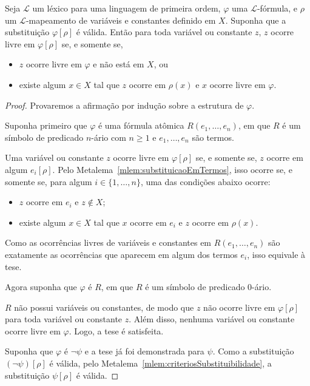 \begin{metalemma}\label{mlem:substituicaoEmFormulas2}
    Seja $\mathcal L$ um léxico para uma linguagem de primeira ordem, $\varphi$ uma $\mathcal L$-fórmula, e $\rho$ um $\mathcal L$-mapeamento de variáveis e constantes definido em $X$.
    Suponha que a substituição $\varphi[\rho]$ é válida.
    Então para toda variável ou constante $z$, $z$ ocorre livre em $\varphi[\rho]$ se, e somente se,
    \begin{itemize}
        \item $z$ ocorre livre em $\varphi$ e não está em $X$, ou
        \item existe algum $x \in X$ tal que $z$ ocorre em $\rho(x)$ e $x$ ocorre livre em $\varphi$.
    \end{itemize}
\end{metalemma}
\begin{proof}
    Provaremos a afirmação por indução sobre a estrutura de $\varphi$.

    Suponha primeiro que $\varphi$ é uma fórmula atômica $R(e_1, \dots, e_n)$, em que $R$ é um símbolo de predicado $n$-ário com $n\geq 1$ e $e_1, \dots, e_n$ são termos.

    Uma variável ou constante $z$ ocorre livre em $\varphi[\rho]$ se, e somente se, $z$ ocorre em algum $e_i[\rho]$.
    Pelo Metalema~\ref{mlem:substituicaoEmTermos}, isso ocorre se, e somente se, para algum $i\in\{1,\dots,n\}$, uma das condições abaixo ocorre:
    \begin{itemize}
        \item $z$ ocorre em $e_i$ e $z\notin X$;
        \item existe algum $x\in X$ tal que $x$ ocorre em $e_i$ e $z$ ocorre em $\rho(x)$.
    \end{itemize}

    Como as ocorrências livres de variáveis e constantes em $R(e_1, \dots, e_n)$ são exatamente as ocorrências que aparecem em algum dos termos $e_i$, isso equivale à tese.
    \smallskip

    Agora suponha que $\varphi$ é $R$, em que $R$ é um símbolo de predicado $0$-ário.

    $R$ não possui variáveis ou constantes, de modo que $z$ não ocorre livre em $\varphi[\rho]$ para toda variável ou constante $z$.
    Além disso, nenhuma variável ou constante ocorre livre em $\varphi$.
    Logo, a tese é satisfeita.
    \smallskip

    Suponha que $\varphi$ é $\neg \psi$ e a tese já foi demonstrada para $\psi$.
    Como a substituição $(\neg\psi)[\rho]$ é válida, pelo Metalema~\ref{mlem:criteriosSubstituibilidade}, a substituição $\psi[\rho]$ é válida.


\end{proof}
